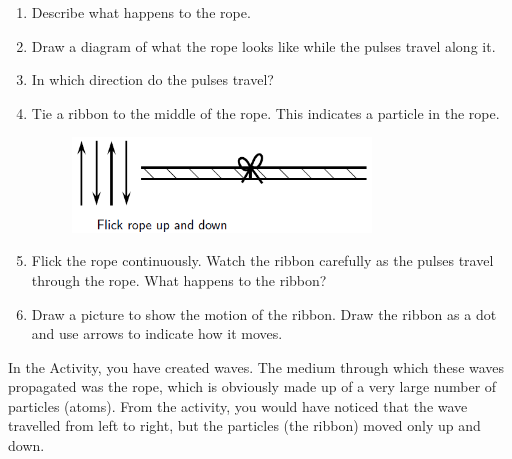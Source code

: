       \label{m38806*id317791}\begin{enumerate}[noitemsep, label=\textbf{\arabic*}. ] 
            \label{m38806*uid1}\item Describe what happens to the rope.
\label{m38806*uid2}\item Draw a diagram of what the rope looks like while the pulses travel along it.
\label{m38806*uid3}\item In which direction do the pulses travel?
\label{m38806*uid4}\item Tie a ribbon to the middle of the rope. This indicates a particle in the rope.
    \setcounter{subfigure}{0}
	\begin{figure}[H] %
    \begin{center}
    \label{m38806*id317844!!!underscore!!!media}\label{m38806*id317844!!!underscore!!!printimage}\includegraphics[width=300px]{col11305.imgs/m38806_PG10C5_002.png} %
      \vspace{2pt}
    \vspace{.1in}
    \end{center}
 \end{figure}       \label{m38806*uid5}\item Flick the rope continuously. Watch the ribbon carefully as the pulses travel through the rope. What happens to the ribbon?
\label{m38806*uid6}\item Draw a picture to show the motion of the ribbon. Draw the ribbon as a dot and use arrows to indicate how it moves.
\end{enumerate}
      \label{m38806*id317884}In the Activity, you have created waves. The medium through which these waves propagated was the rope, which is obviously made up of a very large number of particles (atoms).
From the activity, you would have noticed that the wave travelled from left to right, but the particles (the ribbon) moved only up and down.\par 
    \setcounter{subfigure}{0}
